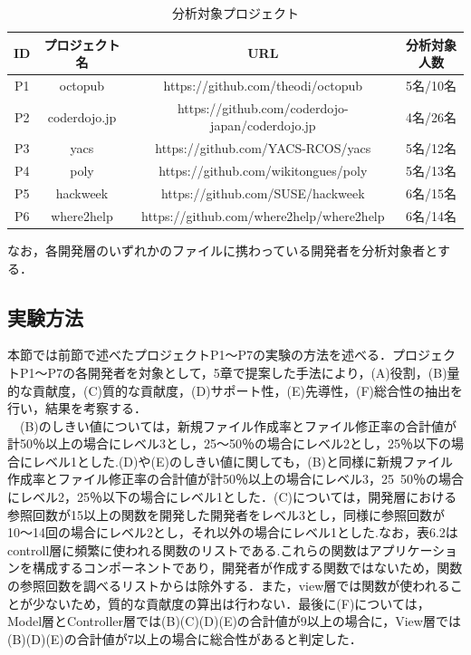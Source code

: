 \documentclass{funthesis}
\begin{document}
\begin{table}[htb]
  \begin{center}
    \begin{tabular}{|c||c||c||c|} \hline
      ID & プロジェクト名 & URL & 分析対象人数  \\ \hline
	  P1 & octopub & https://github.com/theodi/octopub & 5名/10名\\ \hline
      P2 & coderdojo.jp & https://github.com/coderdojo-japan/coderdojo.jp & 4名/26名\\ \hline
      P3 & yacs & https://github.com/YACS-RCOS/yacs & 5名/12名\\ \hline
      P4 & poly & https://github.com/wikitongues/poly & 5名/13名\\ \hline
      P5 & hackweek & https://github.com/SUSE/hackweek & 6名/15名\\ \hline
      P6 & where2help & https://github.com/where2help/where2help & 6名/14名\\ \hline    \end{tabular}
  \end{center}
  \caption{分析対象プロジェクト}    \label{sample}
\end{table}
なお，各開発層のいずれかのファイルに携わっている開発者を分析対象者とする．
\subsection{実験方法}
本節では前節で述べたプロジェクトP1〜P7の実験の方法を述べる．プロジェクトP1〜P7の各開発者を対象として，5章で提案した手法により，(A)役割，(B)量的な貢献度，(C)質的な貢献度，(D)サポート性，(E)先導性，(F)総合性の抽出を行い，結果を考察する．
\\　(B)のしきい値については，新規ファイル作成率とファイル修正率の合計値が計50％以上の場合にレベル3とし，25〜50％の場合にレベル2とし，25％以下の場合にレベル1とした.(D)や(E)のしきい値に関しても，(B)と同様に新規ファイル作成率とファイル修正率の合計値が計50％以上の場合にレベル3，25~50％の場合にレベル2，25％以下の場合にレベル1とした．(C)については，開発層における参照回数が15以上の関数を開発した開発者をレベル3とし，同様に参照回数が10〜14回の場合にレベル2とし，それ以外の場合にレベル1とした.なお，表6.2はcontroll層に頻繁に使われる関数のリストである.これらの関数はアプリケーションを構成するコンポーネントであり，開発者が作成する関数ではないため，関数の参照回数を調べるリストからは除外する．また，view層では関数が使われることが少ないため，質的な貢献度の算出は行わない．最後に(F)については，Model層とController層では(B)(C)(D)(E)の合計値が9以上の場合に，View層では(B)(D)(E)の合計値が7以上の場合に総合性があると判定した．
\end{document}
